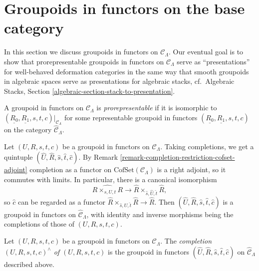 \section{Groupoids in functors on the base category}
\label{section-prorepresentable-groupoids-in-functors}

\noindent
In this section we discuss groupoids in functors on $\mathcal{C}_\Lambda$.
Our eventual goal is to show that prorepresentable groupoids
in functors on $\mathcal{C}_\Lambda$ serve as ``presentations''
for well-behaved deformation categories in the same way that
smooth groupoids in algebraic spaces serve as presentations for
algebraic stacks,
cf.\ Algebraic Stacks, Section \ref{algebraic-section-stack-to-presentation}.

\begin{definition}
\label{definition-prorepresentable-groupoid-in-functors}
A groupoid in functors on $\mathcal{C}_\Lambda$ is {\it prorepresentable}
if it is isomorphic to
$(\underline{R_0}, \underline{R_1}, s, t, c)|_{\mathcal{C}_\Lambda}$
for some representable groupoid in functors
$(\underline{R_0}, \underline{R_1}, s, t, c)$ on the category
$\widehat{\mathcal{C}}_\Lambda$.
\end{definition}

\noindent
Let $(U, R, s, t, c)$ be a groupoid in functors on $\mathcal{C}_\Lambda$.
Taking completions, we get a quintuple
$(\widehat{U}, \widehat{R}, \widehat{s}, \widehat{t}, \widehat{c})$. By
Remark \ref{remark-completion-restriction-cofset-adjoint}
completion as a functor on $\text{CofSet}(\mathcal{C}_\Lambda)$ is a right
adjoint, so it commutes with limits. In particular, there is a canonical
isomorphism
$$
\widehat{R \times_{s, U, t} R}
\longrightarrow
\widehat{R} \times_{\widehat{s}, \widehat{U}, \widehat{t}} \widehat{R},
$$
so $\widehat{c}$ can be regarded as a functor
$\widehat{R} \times_{\widehat{s}, \widehat{U}, \widehat{t}} \widehat{R} \to
\widehat{R}$. Then
$(\widehat{U}, \widehat{R}, \widehat{s}, \widehat{t}, \widehat{c})$
is a groupoid in functors on $\widehat{\mathcal{C}}_\Lambda$, with
identity and inverse morphisms being the completions of those of
$(U, R, s, t, c)$.

\begin{definition}
\label{definition-completion-groupoid-in-functors}
Let $(U, R, s, t, c)$ be a groupoid in functors on $\mathcal{C}_\Lambda$.
The {\it completion $(U, R, s, t, c)^{\wedge}$ of $(U, R, s, t, c)$} is the
groupoid in functors
$(\widehat{U}, \widehat{R}, \widehat{s}, \widehat{t}, \widehat{c})$
on $\widehat{\mathcal{C}}_\Lambda$ described above.
\end{definition}

